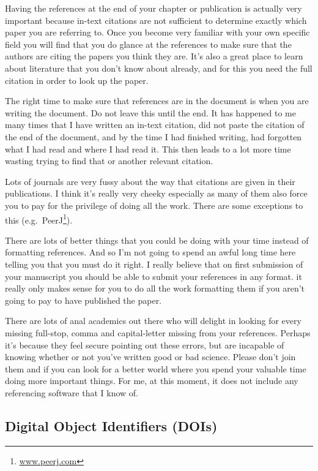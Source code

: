 \documentclass[
]{krantz}
\renewcommand{\href}[2]{#2\footnote{\url{#1}}}
\begin{document}
Having the references at the end of your chapter or publication is actually very important because in-text citations are not sufficient to determine exactly which paper you are referring to. Once you become very familiar with your own specific field you will find that you do glance at the references to make sure that the authors are citing the papers you think they are. It's also a great place to learn about literature that you don't know about already, and for this you need the full citation in order to look up the paper.

The right time to make sure that references are in the document is when you are writing the document. Do not leave this until the end. It has happened to me many times that I have written an in-text citation, did not paste the citation of the end of the document, and by the time I had finished writing, had forgotten what I had read and where I had read it. This then leads to a lot more time wasting trying to find that or another relevant citation.

Lots of journals are very fussy about the way that citations are given in their publications. I think it's really very cheeky especially as many of them also force you to pay for the privilege of doing all the work. There are some exceptions to this (e.g.~\href{www.peerj.com}{PeerJ}).

There are lots of better things that you could be doing with your time instead of formatting references. And so I'm not going to spend an awful long time here telling you that you must do it right. I really believe that on first submission of your manuscript you should be able to submit your references in any format. it really only makes sense for you to do all the work formatting them if you aren't going to pay to have published the paper.

There are lots of anal academics out there who will delight in looking for every missing full-stop, comma and capital-letter missing from your references. Perhaps it's because they feel secure pointing out these errors, but are incapable of knowing whether or not you've written good or bad science. Please don't join them and if you can look for a better world where you spend your valuable time doing more important things. For me, at this moment, it does not include any referencing software that I know of.

\hypertarget{DOI}{%
\subsection{Digital Object Identifiers (DOIs)}\label{DOI}}
\end{document}
